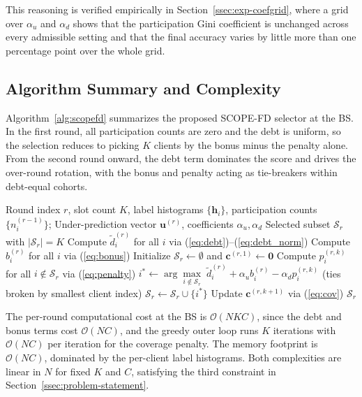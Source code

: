 \documentclass[journal]{IEEEtran}
\newcommand{\rev}[1]{{\color{blue}#1}}
\begin{document}
\rev{This reasoning is verified empirically in Section~\ref{ssec:exp-coefgrid}, where a grid over $\alpha_u$ and $\alpha_d$ shows that the participation Gini coefficient is unchanged across every admissible setting and that the final accuracy varies by little more than one percentage point over the whole grid.}

\subsection{Algorithm Summary and Complexity}
\label{ssec:algorithm-summary}

Algorithm~\ref{alg:scopefd} summarizes the proposed SCOPE-FD selector at the BS. In the first round, all participation counts are zero and the debt is uniform, so the selection reduces to picking $K$ clients by the bonus minus the penalty alone. From the second round onward, the debt term dominates the score and drives the over-round rotation, with the bonus and penalty acting as tie-breakers within debt-equal cohorts.

\begin{algorithm}[t]
\caption{\small SCOPE-FD Selector at Round $r$}
\label{alg:scopefd}
\begin{algorithmic}[1]
\small
\REQUIRE Round index $r$, slot count $K$, label histograms $\{\bm{h}_i\}$, participation counts $\{n_i^{(r-1)}\}$;
\REQUIRE Under-prediction vector $\bm{u}^{(r)}$, coefficients $\alpha_u, \alpha_d$
\ENSURE Selected subset $\mathcal{S}_r$ with $|\mathcal{S}_r|=K$
\STATE Compute $\tilde{d}_i^{(r)}$ for all $i$ via (\ref{eq:debt})--(\ref{eq:debt_norm})
\STATE Compute $b_i^{(r)}$ for all $i$ via (\ref{eq:bonus})
\STATE Initialize $\mathcal{S}_r \leftarrow \emptyset$ and $\bm{c}^{(r,1)} \leftarrow \bm{0}$
    \STATE Compute $p_i^{(r,k)}$ for all $i \notin \mathcal{S}_r$ via (\ref{eq:penalty})
    \STATE $i^{*} \leftarrow \arg\max\limits_{i \notin \mathcal{S}_r}\;\tilde{d}_i^{(r)} + \alpha_u b_i^{(r)} - \alpha_d p_i^{(r,k)}$ (ties broken by smallest client index)
    \STATE $\mathcal{S}_r \leftarrow \mathcal{S}_r \cup \{i^{*}\}$
    \STATE Update $\bm{c}^{(r,k+1)}$ via (\ref{eq:cov})
\ENDFOR
\RETURN $\mathcal{S}_r$
\end{algorithmic}
\end{algorithm}

The per-round computational cost at the BS is $\mathcal{O}(NKC)$, since the debt and bonus terms cost $\mathcal{O}(NC)$, and the greedy outer loop runs $K$ iterations with $\mathcal{O}(NC)$ per iteration for the coverage penalty. The memory footprint is $\mathcal{O}(NC)$, dominated by the per-client label histograms. Both complexities are linear in $N$ for fixed $K$ and $C$, satisfying the third constraint in Section~\ref{ssec:problem-statement}.
\end{document}

